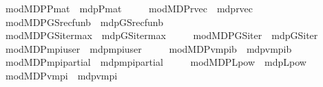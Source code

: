 \begin{isabellebody}
\ \ \ \ \ mod{\isacharunderscore}{\kern0pt}MDP{\isacharunderscore}{\kern0pt}P{\isacharunderscore}{\kern0pt}mat\ {\isacharequal}{\kern0pt}\ mdp{\isachardot}{\kern0pt}P{\isacharunderscore}{\kern0pt}mat\isanewline
\ \ \ \ \ mod{\isacharunderscore}{\kern0pt}MDP{\isacharunderscore}{\kern0pt}r{\isacharunderscore}{\kern0pt}vec{\isacharprime}{\kern0pt}\ {\isacharequal}{\kern0pt}\ mdp{\isachardot}{\kern0pt}r{\isacharunderscore}{\kern0pt}vec{\isacharprime}{\kern0pt}\isanewline
\ \ \ \ \ mod{\isacharunderscore}{\kern0pt}MDP{\isacharunderscore}{\kern0pt}GS{\isacharunderscore}{\kern0pt}rec{\isacharunderscore}{\kern0pt}fun\isactrlsub b\ {\isacharequal}{\kern0pt}\ mdp{\isachardot}{\kern0pt}GS{\isacharunderscore}{\kern0pt}rec{\isacharunderscore}{\kern0pt}fun\isactrlsub b\isanewline
\ \ \ \ \ mod{\isacharunderscore}{\kern0pt}MDP{\isacharunderscore}{\kern0pt}GS{\isacharunderscore}{\kern0pt}iter{\isacharunderscore}{\kern0pt}max\ {\isacharequal}{\kern0pt}\ mdp{\isachardot}{\kern0pt}GS{\isacharunderscore}{\kern0pt}iter{\isacharunderscore}{\kern0pt}max\isanewline
\ \ \ \ \ mod{\isacharunderscore}{\kern0pt}MDP{\isacharunderscore}{\kern0pt}GS{\isacharunderscore}{\kern0pt}iter\ {\isacharequal}{\kern0pt}\ mdp{\isachardot}{\kern0pt}GS{\isacharunderscore}{\kern0pt}iter\isanewline
\ \ \ \ \ mod{\isacharunderscore}{\kern0pt}MDP{\isacharunderscore}{\kern0pt}mpi{\isacharunderscore}{\kern0pt}user\ {\isacharequal}{\kern0pt}\ mdp{\isachardot}{\kern0pt}mpi{\isacharunderscore}{\kern0pt}user\isanewline
\ \ \ \ \ mod{\isacharunderscore}{\kern0pt}MDP{\isacharunderscore}{\kern0pt}v{}{\isacharunderscore}{\kern0pt}mpi\isactrlsub b\ {\isacharequal}{\kern0pt}\ mdp{\isachardot}{\kern0pt}v{}{\isacharunderscore}{\kern0pt}mpi\isactrlsub b\isanewline
\ \ \ \ \ mod{\isacharunderscore}{\kern0pt}MDP{\isacharunderscore}{\kern0pt}mpi{\isacharunderscore}{\kern0pt}partial{\isacharprime}{\kern0pt}\ {\isacharequal}{\kern0pt}\ mdp{\isachardot}{\kern0pt}mpi{\isacharunderscore}{\kern0pt}partial{\isacharprime}{\kern0pt}\isanewline
\ \ \ \ \ mod{\isacharunderscore}{\kern0pt}MDP{\isacharunderscore}{\kern0pt}L{\isacharunderscore}{\kern0pt}pow\ {\isacharequal}{\kern0pt}\ mdp{\isachardot}{\kern0pt}L{\isacharunderscore}{\kern0pt}pow\isanewline
\ \ \ \ \ mod{\isacharunderscore}{\kern0pt}MDP{\isacharunderscore}{\kern0pt}v{}{\isacharunderscore}{\kern0pt}mpi\ {\isacharequal}{\kern0pt}\ mdp{\isachardot}{\kern0pt}v{}{\isacharunderscore}{\kern0pt}mpi\isanewline

\end{isabellebody}
